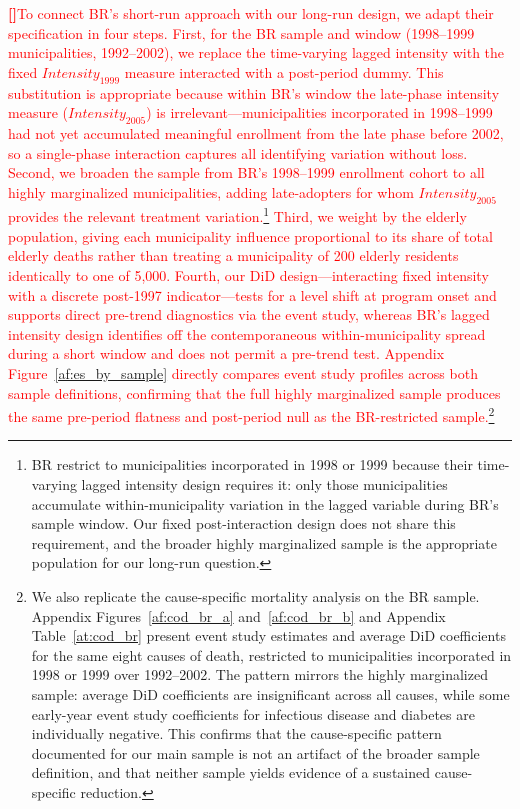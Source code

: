 \documentclass[12pt]{article}
\newcounter{paragraphnum}
\newcommand{\p}{\refstepcounter{paragraphnum}\textbf{[\theparagraphnum]}\enspace}
\begin{document}
\textcolor{red}{\p To connect BR's short-run approach with our long-run design, we adapt their specification in four steps. First, for the BR sample and window (1998--1999 municipalities, 1992--2002), we replace the time-varying lagged intensity with the fixed $\textit{Intensity}_{1999}$ measure interacted with a post-period dummy. This substitution is appropriate because within BR's window the late-phase intensity measure ($\textit{Intensity}_{2005}$) is irrelevant—municipalities incorporated in 1998--1999 had not yet accumulated meaningful enrollment from the late phase before 2002, so a single-phase interaction captures all identifying variation without loss. Second, we broaden the sample from BR's 1998--1999 enrollment cohort to all highly marginalized municipalities, adding late-adopters for whom $\textit{Intensity}_{2005}$ provides the relevant treatment variation.\footnote{BR restrict to municipalities incorporated in 1998 or 1999 because their time-varying lagged intensity design requires it: only those municipalities accumulate within-municipality variation in the lagged variable during BR's sample window. Our fixed post-interaction design does not share this requirement, and the broader highly marginalized sample is the appropriate population for our long-run question.} Third, we weight by the elderly population, giving each municipality influence proportional to its share of total elderly deaths rather than treating a municipality of 200 elderly residents identically to one of 5,000. Fourth, our DiD design—interacting fixed intensity with a discrete post-1997 indicator—tests for a level shift at program onset and supports direct pre-trend diagnostics via the event study, whereas BR's lagged intensity design identifies off the contemporaneous within-municipality spread during a short window and does not permit a pre-trend test. Appendix Figure~\ref{af:es_by_sample} directly compares event study profiles across both sample definitions, confirming that the full highly marginalized sample produces the same pre-period flatness and post-period null as the BR-restricted sample.\footnote{We also replicate the cause-specific mortality analysis on the BR sample. Appendix Figures~\ref{af:cod_br_a} and~\ref{af:cod_br_b} and Appendix Table~\ref{at:cod_br} present event study estimates and average DiD coefficients for the same eight causes of death, restricted to municipalities incorporated in 1998 or 1999 over 1992--2002. The pattern mirrors the highly marginalized sample: average DiD coefficients are insignificant across all causes, while some early-year event study coefficients for infectious disease and diabetes are individually negative. This confirms that the cause-specific pattern documented for our main sample is not an artifact of the broader sample definition, and that neither sample yields evidence of a sustained cause-specific reduction.}}
\end{document}

